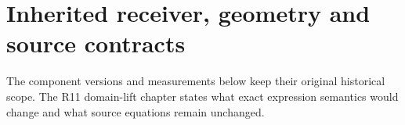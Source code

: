 \section*{Inherited receiver, geometry and source contracts}
The component versions and measurements below keep their original historical
scope. The R11 domain-lift chapter states what exact expression semantics would
change and what source equations remain unchanged.


